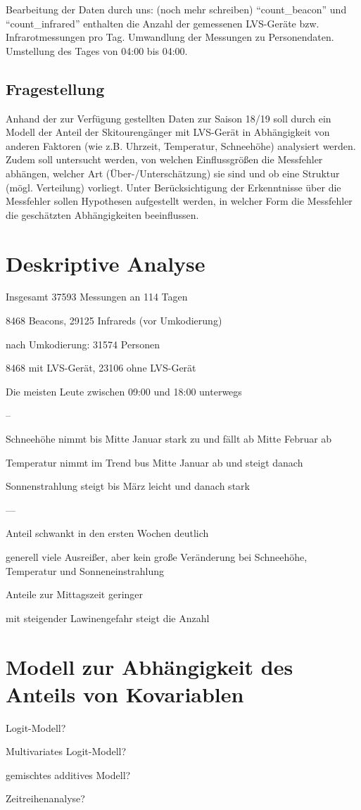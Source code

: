 \documentclass[11pt,a4paper]{report}
\begin{document}
Bearbeitung der Daten durch uns:
(noch mehr schreiben)
"`count\_beacon"' und "`count\_infrared"' enthalten die Anzahl der gemessenen LVS-Geräte bzw. Infrarotmessungen pro Tag.
Umwandlung der Messungen zu Personendaten. Umstellung des Tages von 04:00 bis 04:00.

\section{Fragestellung}
Anhand der zur Verfügung gestellten Daten zur Saison 18/19 soll durch ein Modell der Anteil der Skitourengänger mit LVS-Gerät in Abhängigkeit von anderen Faktoren (wie z.B. Uhrzeit, Temperatur, Schneehöhe) analysiert werden.
Zudem soll untersucht werden, von welchen Einflussgrößen die Messfehler abhängen, welcher Art (Über-/Unterschätzung) sie sind und ob eine Struktur (mögl. Verteilung) vorliegt.
Unter Berücksichtigung der Erkenntnisse über die Messfehler sollen Hypothesen aufgestellt werden, in welcher Form die Messfehler die geschätzten Abhängigkeiten beeinflussen.





\chapter{Deskriptive Analyse}
Insgesamt 37593 Messungen an 114 Tagen

8468 Beacons, 29125 Infrareds (vor Umkodierung)

nach Umkodierung: 31574 Personen

8468 mit LVS-Gerät, 23106 ohne LVS-Gerät

Die meisten Leute zwischen 09:00 und 18:00 unterwegs

--

Schneehöhe nimmt bis Mitte Januar stark zu und fällt ab Mitte Februar ab

Temperatur nimmt im Trend bus Mitte Januar ab und steigt danach
 
Sonnenstrahlung steigt bis März leicht und danach stark


---


Anteil schwankt in den ersten Wochen deutlich

generell viele Ausreißer, aber kein große Veränderung bei Schneehöhe, Temperatur und Sonneneinstrahlung

Anteile zur Mittagszeit geringer

mit steigender Lawinengefahr steigt die Anzahl

\chapter{Modell zur Abhängigkeit des Anteils von Kovariablen}

Logit-Modell?

Multivariates Logit-Modell?

gemischtes additives Modell?

Zeitreihenanalyse?
	
	
\end{document}
